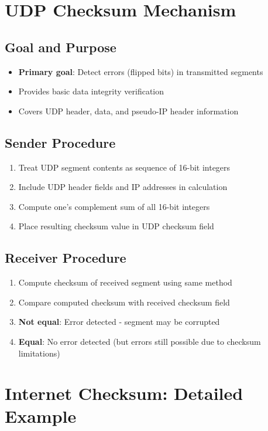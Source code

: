 \documentclass[12pt]{article}
\begin{document}
\section{UDP Checksum Mechanism}

\subsection{Goal and Purpose}
\begin{itemize}
    \item \textbf{Primary goal}: Detect errors (flipped bits) in transmitted segments
    \item Provides basic data integrity verification
    \item Covers UDP header, data, and pseudo-IP header information
\end{itemize}

\subsection{Sender Procedure}
\begin{enumerate}
    \item Treat UDP segment contents as sequence of 16-bit integers
    \item Include UDP header fields and IP addresses in calculation
    \item Compute one's complement sum of all 16-bit integers
    \item Place resulting checksum value in UDP checksum field
\end{enumerate}

\subsection{Receiver Procedure}
\begin{enumerate}
    \item Compute checksum of received segment using same method
    \item Compare computed checksum with received checksum field
    \item \textbf{Not equal}: Error detected - segment may be corrupted
    \item \textbf{Equal}: No error detected (but errors still possible due to checksum limitations)
\end{enumerate}

\section{Internet Checksum: Detailed Example}
\end{document}
